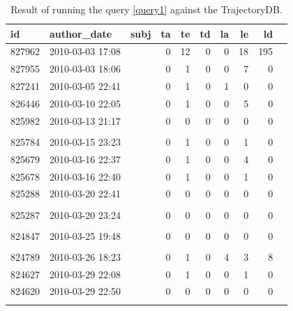 \documentclass[a4paper,10pt]{article}
\numberwithin{equation}{subsection}
\begin{document}
\begin{table}[h]
  \tiny
  \label{tab:first}
  \caption{Result of running the query \ref{query1} against the TrajectoryDB. }
  \begin{tabularx}{\textwidth}{ | l | l | X | r | r | r | r | r | r | r |}
  \hline           
id & author\_date & subj & ta & te & td & la & le & ld\\ 
\hline           
827962 & 2010-03-03 17:08 & \verb7sparc64: Kill off old sys_perfctr system call and state.7 & 0 & 12 & 0 & 0 & 18 & 195\\ 
827955 & 2010-03-03 18:06 & \verb1sparc64: Make prom entry spinlock NMI safe.1 & 0 & 1 & 0 & 0 & 7 & 0\\ 
827241 & 2010-03-05 22:41 & \verb1timbgpio: fix build1 & 0 & 1 & 0 & 1 & 0 & 0\\ 
826446 & 2010-03-10 22:05 & \verb1uartlite: Fix build on sparc.1 & 0 & 1 & 0 & 0 & 5 & 0\\ 
825982 & 2010-03-13 21:17 & \verb1Merge branch 'master' of1 & 0 & 0 & 0 & 0 & 0 & 0\\
& & \verb1git://git.kernel.org/pub/scm/linux/kernel/git/linville/wireless-2.61 &  &  &  &  &  & \\  
825784 & 2010-03-15 23:23 & \verb7e100: Fix ring parameter change handling regression.7 & 0 & 1 & 0 & 0 & 1 & 0\\ 
825679 & 2010-03-16 22:37 & \verb1bridge: Make first arg to deliver_clone const.1 & 0 & 1 & 0 & 0 & 4 & 0\\ 
825678 & 2010-03-16 22:40 & \verb7sunxvr1000: Add missing FB=y depenency.7 & 0 & 1 & 0 & 0 & 1 & 0\\ 
825288 & 2010-03-20 22:41 & \verb1Merge branch 'vhost' of 1 & 0 & 0 & 0 & 0 & 0 & 0\\
& & \verb1git://git.kernel.org/pub/scm/linux/kernel/git/mst/vhost1 &  &  &  &  &  & \\  
825287 & 2010-03-20 23:24 & \verb1Merge branch 'master' of 1 & 0 & 0 & 0 & 0 & 0 & 0\\ 
& & \verb1master.kernel.org:/pub/scm/linux/kernel/git/davem/net-2.61 &  &  &  &  &  & \\  
824847 & 2010-03-25 19:48 & \verb1Merge branch 'master' of 1 & 0 & 0 & 0 & 0 & 0 & 0\\ 
& & \verb1git://git.kernel.org/pub/scm/linux/kernel/git/kaber/nf-2.61 &  &  &  &  &  & \\  
824789 & 2010-03-26 18:23 & \verb7Revert r8169: enable 64-bit DMA by default for PCI Express devices (v2)"7 & 0 & 1 & 0 & 4 & 3 & 8\\ 
824627 & 2010-03-29 22:08 & \verb1sparc64: Properly truncate pt_regs framepointer in perf callback.1 & 0 & 1 & 0 & 0 & 1 & 0\\ 
824620 & 2010-03-29 22:50 & \verb1Merge branch 'master' of 1 & 0 & 0 & 0 & 0 & 0 & 0\\
& & \verb1git://git.kernel.org/pub/scm/linux/kernel/git/linville/wireless-next-2.61 &  &  &  &  &  & \\  
\hline           
  \end{tabularx}
\end{table}
\end{document}
